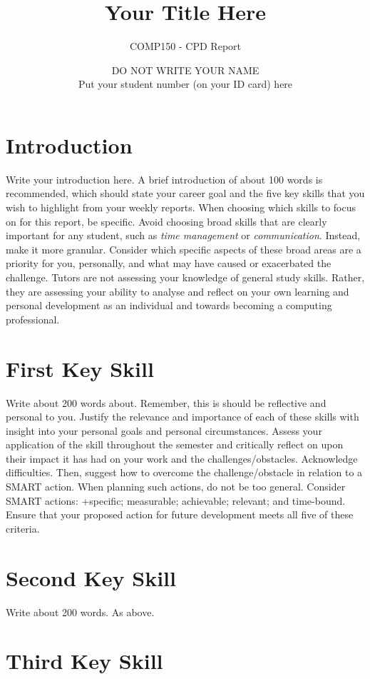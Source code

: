 \documentclass{scrartcl}
\title{Your Title Here}
\subtitle{COMP150 - CPD Report}
\author{DO NOT WRITE YOUR NAME\\Put your student number (on your ID card) here}
\begin{document}
\maketitle

\section{Introduction}

Write your introduction here. A brief introduction of about 100 words is recommended, which should state your career goal and the five key skills that you wish to highlight from your weekly reports. When choosing which skills to focus on for this report, be specific. Avoid choosing broad skills that are clearly important for any student, such as \textit{time management} or \textit{communication}. Instead, make it more granular. Consider which specific aspects of these broad areas are a priority for you, personally, and what may have caused or exacerbated the challenge. Tutors are not assessing your knowledge of general study skills. Rather, they are assessing your ability to analyse and reflect on your own learning and personal development as an individual and towards becoming a computing professional.

\section{First Key Skill}

Write about 200 words about. Remember, this is should be reflective and personal to you. Justify the relevance and importance of each of these skills with insight into your personal goals and personal circumstances. Assess your application of the skill throughout the semester and critically reflect on upon their impact it has had on your work and the challenges/obstacles. Acknowledge difficulties. Then, suggest how to overcome the challenge/obstacle in relation to a SMART action. When planning such actions, do not be too general. Consider SMART actions:
 +specific; measurable; achievable; relevant; and time-bound. Ensure that your proposed action for future development meets all five of these criteria.

\section{Second Key Skill}

Write about 200 words. As above.

\section{Third Key Skill}
\end{document}
